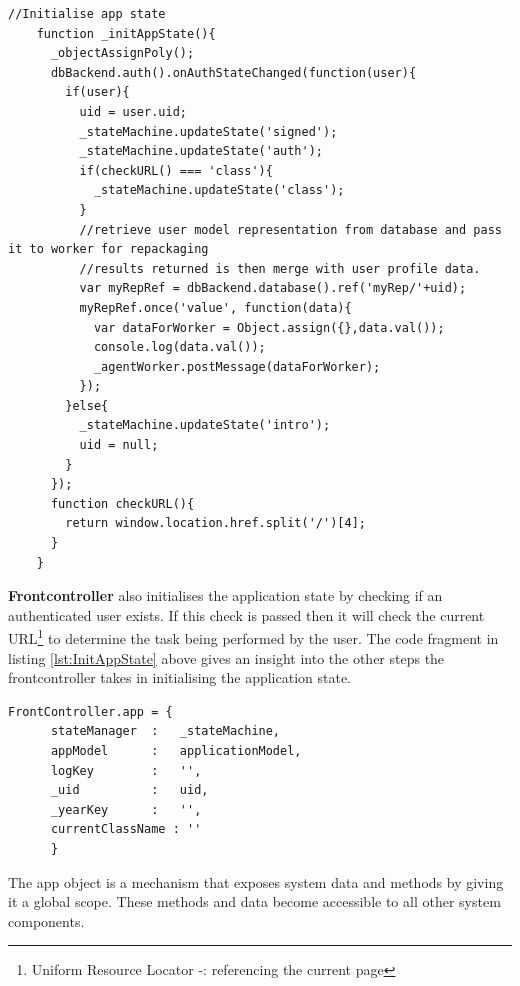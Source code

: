 \begin{lstlisting}[caption={Initiating the application state from the front controller}, label={lst:InitAppState}]
    //Initialise app state
    function _initAppState(){
      _objectAssignPoly();
      dbBackend.auth().onAuthStateChanged(function(user){
        if(user){
          uid = user.uid;
          _stateMachine.updateState('signed');
          _stateMachine.updateState('auth');
          if(checkURL() === 'class'){
            _stateMachine.updateState('class');
          }
          //retrieve user model representation from database and pass it to worker for repackaging
          //results returned is then merge with user profile data.
          var myRepRef = dbBackend.database().ref('myRep/'+uid);
          myRepRef.once('value', function(data){
            var dataForWorker = Object.assign({},data.val());
            console.log(data.val());
            _agentWorker.postMessage(dataForWorker);
          });
        }else{
          _stateMachine.updateState('intro');
          uid = null;
        }
      });
      function checkURL(){
        return window.location.href.split('/')[4];
      }
    }
\end{lstlisting}

\textbf{Frontcontroller} also initialises the application state by checking if an authenticated user exists. If this check is passed then it will check the current URL\footnote{Uniform Resource Locator -: referencing the current page} to determine the task being performed by the user. The code fragment in listing \ref{lst:InitAppState} above gives an insight into the other steps the frontcontroller takes in initialising the application state.


\begin{lstlisting}[caption={Frontcontroller app model}, label={lst:FrontControllerAppModel}]
    FrontController.app = {
      stateManager  :   _stateMachine,
      appModel      :   applicationModel,
      logKey        :   '',
      _uid          :   uid,
      _yearKey      :   '',
      currentClassName : ''
      }
\end{lstlisting}
The app object is a mechanism that exposes system data and methods by giving it a global scope. These methods and data become accessible to all other system components.

